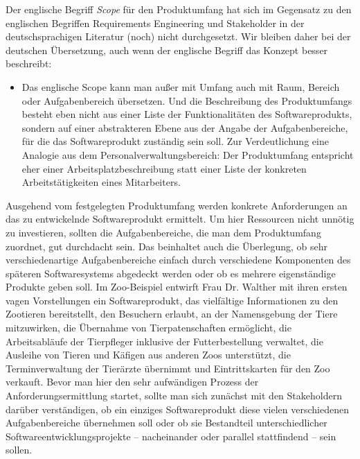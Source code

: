 Der englische Begriff \textit{Scope} für den Produktumfang hat sich im Gegensatz zu den englischen Begriffen Requirements Engineering und Stakeholder in der deutschsprachigen Literatur (noch) nicht durchgesetzt. Wir bleiben daher bei der deutschen Übersetzung, auch wenn der englische Begriff das Konzept besser beschreibt:

\vspace{2mm} %

\begin{itemize}[
	label={\sttpHervorhebung{$\Rightarrow$}},
	]
	\item Das englische Scope kann man außer mit Umfang auch mit Raum, Bereich oder Aufgabenbereich übersetzen. Und die Beschreibung des Produktumfangs besteht eben nicht aus einer Liste der Funktionalitäten des Softwareprodukts, sondern auf einer abstrakteren Ebene aus der Angabe der Aufgabenbereiche, für die das Softwareprodukt zuständig sein soll. Zur Verdeutlichung eine Analogie aus dem Personalverwaltungsbereich: Der Produktumfang entspricht eher einer Arbeitsplatzbeschreibung statt einer Liste der konkreten Arbeits\-tätig\-keiten eines Mitarbeiters.
\end{itemize}

\vspace{2mm} %

Ausgehend vom festgelegten Produktumfang werden konkrete Anforderungen an das zu entwickelnde Softwareprodukt ermittelt. Um hier Ressourcen nicht unnötig zu investieren, sollten die Aufgabenbereiche, die man dem Produktumfang zuordnet, gut durchdacht sein. Das beinhaltet auch die Überlegung, ob sehr verschiedenartige Aufgabenbereiche einfach durch verschiedene Komponenten des späteren Softwaresystems abgedeckt werden oder ob es mehrere eigenständige Produkte geben soll. Im Zoo-Beispiel entwirft Frau Dr. Walther mit ihren ersten vagen Vorstellungen ein Softwareprodukt, das vielfältige Informationen zu den Zootieren bereitstellt, den Besuchern erlaubt, an der Namensgebung der Tiere mitzuwirken, die Übernahme von Tierpatenschaften ermöglicht, die Arbeitsabläufe der Tierpfleger inklusive der Futter\-bestellung verwaltet, die Ausleihe von Tieren und Käfigen aus anderen Zoos unterstützt, die Terminverwaltung der Tierärzte übernimmt und Eintrittskarten für den Zoo verkauft. Bevor man hier den sehr aufwändigen Prozess der Anforderungs\-ermittlung startet, sollte man sich zunächst mit den Stakeholdern darüber verständigen, ob ein einziges Softwareprodukt diese vielen verschiedenen Aufgabenbereiche übernehmen soll oder ob sie Bestandteil unterschiedlicher Software\-entwicklungs\-projekte -- nacheinander oder parallel stattfindend -- sein sollen.

